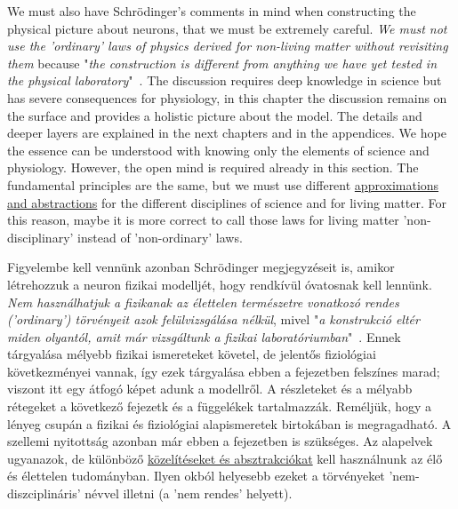 \fi


 
\ifx\magyar\undefined
We must also have Schrödinger's comments in mind when constructing the \hypertarget{PhysicalPictureNeuron}{physical picture
about neurons}, that we must be extremely careful. \textit{We must not use the
'ordinary' laws of physics derived for non-living matter without revisiting them} because "\textit{the construction is different from anything we have yet tested in the physical laboratory}"~\cite{Schrodinger:1992}.
The discussion requires deep knowledge in science but
has severe consequences for physiology,
in this chapter the discussion remains on the surface and provides a holistic picture about the model.
The details and deeper layers are explained in the next chapters
and in the appendices. 
We hope the essence can be understood with knowing only
the elements of science and physiology. However, the open mind is required
already in this section.
The fundamental principles are the same, but we must use different 
\hyperlink{Abstractions}{approximations
 and abstractions} for the different disciplines of science and for living matter. For this reason,
maybe it is more correct to call those laws for living matter 'non-disciplinary'
instead of 'non-ordinary' laws.

\else
Figyelembe kell vennünk azonban Schrödinger megjegyzéseit is, amikor
létrehozzuk \hypertarget{PhysicalPictureNeuron}{a neuron fizikai modelljét}, hogy rendkívül óvatosnak kell lennünk.
\textit{Nem használhatjuk a fizikanak az élettelen természetre vonatkozó rendes ('ordinary')
törvényeit azok felülvizsgálása nélkül}, mivel "\textit{a konstrukció eltér miden olyantól, amit már vizsgáltunk a fizikai laboratóriumban}"~\cite{Schrodinger:1992}.
Ennek tárgyalása mélyebb fizikai ismereteket követel, de
jelentős fiziológiai következményei vannak,
így ezek tárgyalása ebben a fejezetben felszínes marad;
viszont itt egy átfogó képet adunk a modellről.
A részleteket és a mélyabb rétegeket a következő fejezetk és 
a függelékek tartalmazzák.
Reméljük, hogy a lényeg csupán a fizikai és fiziológiai alapismeretek
birtokában is megragadható.
A szellemi nyitottság azonban már ebben a fejezetben is szükséges.
Az alapelvek ugyanazok, de különböző \hyperlink{Abstractions}{közelítéseket és absztrakciókat} kell használnunk az élő és
élettelen tudományban. Ilyen okból helyesebb ezeket a törvényeket
'nem-diszciplináris' névvel illetni (a 'nem rendes' helyett).
\fi


